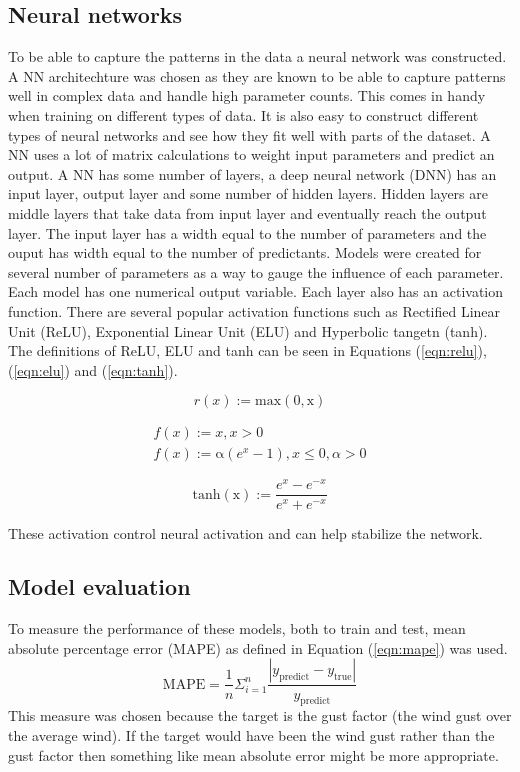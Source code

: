 \subsection{Neural networks}
To be able to capture the patterns in the data a neural network was constructed. A NN architechture was chosen as they are known to be able to capture patterns well in complex data and handle high parameter counts. This comes in handy when training on different types of data. It is also easy to construct different types of neural networks and see how they fit well with parts of the dataset. A NN uses a lot of matrix calculations to weight input parameters and predict an output. A NN has some number of layers, a deep neural network (DNN) has an input layer, output layer and some number of hidden layers. Hidden layers are middle layers that take data from input layer and eventually reach the output layer. The input layer has a width equal to the number of parameters and the ouput has width equal to the number of predictants. Models were created for several number of parameters as a way to gauge the influence of each parameter. Each model has one numerical output variable. Each layer also has an activation function. There are several popular activation functions such as Rectified Linear Unit (ReLU), Exponential Linear Unit (ELU) and Hyperbolic tangetn (tanh). The definitions of ReLU, ELU and tanh can be seen in Equations (\ref{eqn:relu}), (\ref{eqn:elu}) and (\ref{eqn:tanh}). 

\begin{equation}
    \label{eqn:relu}
    r(x):=\mathrm{max(0, x)}
\end{equation}

\begin{align}
    \label{eqn:elu}
    f(x) := x, x > 0\\
    f(x) := \mathrm{\alpha} (e^x-1), x\leq 0, \alpha > 0
\end{align}

\begin{equation}
    \label{eqn:tanh}
    \mathrm{tanh(x)}:=\frac{e^x-e^{-x}}{e^x+e^{-x}}
\end{equation}

These activation control neural activation and can help stabilize the network.

\subsection{Model evaluation}
 To measure the performance of these models, both to train and test, mean absolute percentage error (MAPE) as defined in Equation (\ref{eqn:mape}) was used.
\begin{equation}
    \label{eqn:mape}
    \text{MAPE} = \frac{1}{n}\Sigma_{i=1}^n\frac{|y_{\mathrm{predict}} - y_{\mathrm{true}}|}{y_{\mathrm{predict}}}
\end{equation}
This measure was chosen because the target is the gust factor (the wind gust over the average wind). If the target would have been the wind gust rather than the gust factor then something like mean absolute error might be more appropriate.

